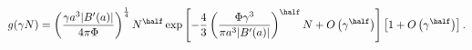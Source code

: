 \begin{equation}
\label{Eq_A35}
g(\gamma N)
  = \left(\frac{\gamma a^3|B'(a)|}{4\pi\Phi}\right)^{\frac{1}{4}}
  N^{\half}
  \exp
  \left[
  - \frac{4}{3} \left(\frac{\Phi\gamma^3}{\pi a^3|B'(a)|}\right)^{\half}
  N + O\left(\gamma^{\half}\right)
  \right]
  \left[1 + O\left(\gamma^{\half}\right)\right].
\end{equation}

